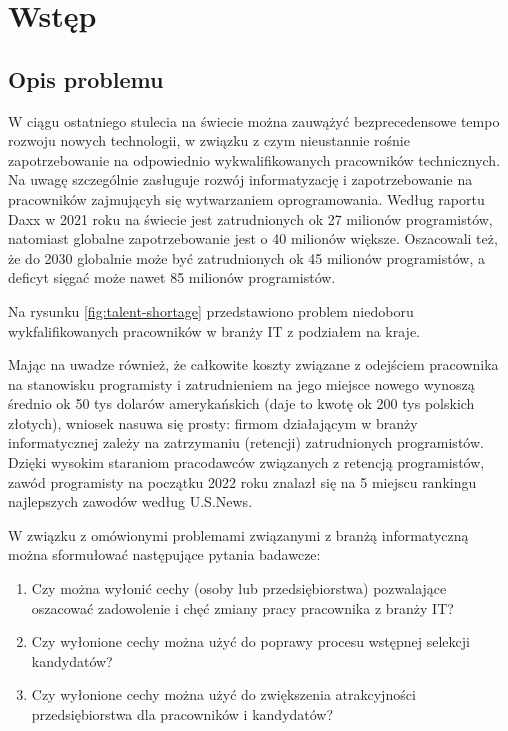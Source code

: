 
\chapter*{Wstęp}\label{ch:admission}

\section*{Opis problemu}\label{sec:admission:problem-description}

W ciągu ostatniego stulecia na świecie można zauwążyć bezprecedensowe tempo rozwoju nowych technologii,
w związku z czym nieustannie rośnie zapotrzebowanie na odpowiednio wykwalifikowanych pracowników technicznych.
Na uwagę szczególnie zasługuje rozwój informatyzację i zapotrzebowanie na pracowników zajmującyh się wytwarzaniem oprogramowania.
Według raportu Daxx w 2021 roku na świecie jest zatrudnionych ok 27 milionów programistów, natomiast globalne zapotrzebowanie jest o 40 milionów większe.
Oszacowali też, że do 2030 globalnie może być zatrudnionych ok 45 milionów programistów, a deficyt sięgać może nawet 85 milionów programistów\cite{daxx-2021}.

Na rysunku \ref{fig:talent-shortage} przedstawiono problem niedoboru wykfalifikowanych pracowników w branży IT z podziałem na kraje.


Mając na uwadze również, że całkowite koszty związane z odejściem pracownika na stanowisku programisty i zatrudnieniem na jego miejsce nowego
wynoszą średnio ok 50 tys dolarów amerykańskich\cite{hairing-dev-2021} (daje to kwotę ok 200 tys polskich złotych), wniosek nasuwa się prosty:
firmom działającym w branży informatycznej zależy na zatrzymaniu (retencji) zatrudnionych programistów.
Dzięki wysokim staraniom pracodawców związanych z retencją programistów,
zawód programisty na początku 2022 roku znalazł się na 5 miejscu rankingu najlepszych zawodów według U.S.News\cite{us-news-2022}.

W związku z omówionymi problemami związanymi z branżą informatyczną można sformułować następujące pytania badawcze:
\begin{enumerate}
    \item Czy można wyłonić cechy (osoby lub przedsiębiorstwa) pozwalające oszacować zadowolenie i chęć zmiany pracy pracownika z branży IT?
    \item Czy wyłonione cechy można użyć do poprawy procesu wstępnej selekcji kandydatów?
    \item Czy wyłonione cechy można użyć do zwiększenia atrakcyjności przedsiębiorstwa dla pracowników i kandydatów?
\end{enumerate}

